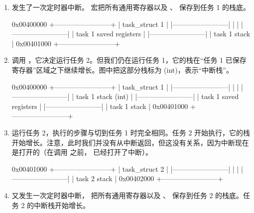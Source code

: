 \begin{enumerate}
\begin{txtcode}
0x00400000 +------------------+
           | task_struct 1    |
           |------------------|
           |                  |
           |------------------|
           | task 1 stack     |
0x00401000 +------------------+
           | task_struct 2    |
           |------------------|
           |                  |
0x00402000 +------------------+
\end{txtcode}
  \item 发生了一次定时器中断。 宏把所有通用寄存器以及 、 保存到任务 1 的栈底。
\begin{txtcode}
0x00400000 +------------------------+
           | task_struct 1          |
           |------------------------|
           |                        |
           |------------------------|
           | task 1 saved registers |
           |------------------------|
           | task 1 stack           |
0x00401000 +------------------------+
\end{txtcode}
  \item 调用 ，它决定运行任务 2。但我们仍在运行任务 1，它的栈在“任务 1 已保存寄存器”区域之下继续增长。图中把这部分栈标为 (int)，表示“中断栈”。
\begin{txtcode}
0x00400000 +------------------------+
           | task_struct 1          |
           |------------------------|
           |                        |
           |------------------------|
           | task 1 stack (int)     |
           |------------------------|
           | task 1 saved registers |
           |------------------------|
           | task 1 stack           |
0x00401000 +------------------------+
\end{txtcode}
  \item {} 运行任务 2，执行的步骤与切到任务 1 时完全相同。任务 2 开始执行，它的栈开始增长。注意，此时我们并没有从中断返回，但这没有关系，因为中断现在是打开的（在调用  之前， 已经打开了中断）。
\begin{txtcode}
0x00401000 +------------------------+
           | task_struct 2          |
           |------------------------|
           |                        |
           |------------------------|
           | task 2 stack           |
0x00402000 +------------------------+
\end{txtcode}
  \item 又发生一次定时器中断， 把所有通用寄存器以及 、 保存到任务 2 的栈底。任务 2 的中断栈开始增长。

\end{enumerate}
